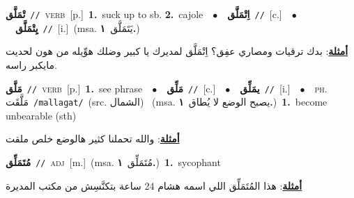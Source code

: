 \documentclass[10pt,a4paper,twoside]{article} %
\begin{document}
\begin{multicols}{2}
{\setlength\topsep{0pt}\textbf{\foreignlanguage{arabic}{تْمَلَّق}}\ {\color{gray}\texttt{//}\color{black}}\ \textsc{verb}\ [p.]\ \textbf{1.}~suck up to sb.  \textbf{2.}~cajole\ \ $\bullet$\ \ \setlength\topsep{0pt}\textbf{\foreignlanguage{arabic}{اِتْمَلَّق}}\ {\color{gray}\texttt{//}\color{black}}\ [c.]\ \ $\bullet$\ \ \setlength\topsep{0pt}\textbf{\foreignlanguage{arabic}{يِتْمَلَّق}}\ {\color{gray}\texttt{//}\color{black}}\ [i.]\ \color{gray}(msa. \foreignlanguage{arabic}{يَتَمَلَّق}~\foreignlanguage{arabic}{\textbf{١.}})\color{black}\  \begin{flushright}\color{gray}\foreignlanguage{arabic}{\textbf{\underline{\foreignlanguage{arabic}{أمثلة}}}: بدك ترقيات ومصاري عفِق؟ اِتْمَلَّق لمديرك يا كبير وضلك هوِّيله من هون لحديت مايكبر راسه.}\end{flushright}\color{black}} \vspace{2mm}

{\setlength\topsep{0pt}\textbf{\foreignlanguage{arabic}{مَلَّق}}\ {\color{gray}\texttt{//}\color{black}}\ \textsc{verb}\ [p.]\ \textbf{1.}~see phrase\ \ $\bullet$\ \ \setlength\topsep{0pt}\textbf{\foreignlanguage{arabic}{مَلِّق}}\ {\color{gray}\texttt{//}\color{black}}\ [c.]\ \ $\bullet$\ \ \setlength\topsep{0pt}\textbf{\foreignlanguage{arabic}{يمَلِّق}}\ {\color{gray}\texttt{//}\color{black}}\ [i.]\ \ $\bullet$\ \ \textsc{ph.} \color{gray} \foreignlanguage{arabic}{مَلَّقَت}\color{black}\ {\color{gray}\texttt{/{\sffamily mallaɡat}/}\color{black}}\ \color{gray}(src. \foreignlanguage{arabic}{الشمال})\color{black}\ \color{gray} (msa. \foreignlanguage{arabic}{يصبح الوضع لا يُطاق}~\foreignlanguage{arabic}{\textbf{١.}})\color{black}\ \textbf{1.}~become unbearable (sth)\  \begin{flushright}\color{gray}\foreignlanguage{arabic}{\textbf{\underline{\foreignlanguage{arabic}{أمثلة}}}: والله تحملنا كثير هالوضع خلص ملقت}\end{flushright}\color{black}} \vspace{2mm}

{\setlength\topsep{0pt}\textbf{\foreignlanguage{arabic}{مُتَمَلِّق}}\ {\color{gray}\texttt{//}\color{black}}\ \textsc{adj}\ [m.]\ \color{gray}(msa. \foreignlanguage{arabic}{مُتَمَلِّق}~\foreignlanguage{arabic}{\textbf{١.}})\color{black}\ \textbf{1.}~sycophant\  \begin{flushright}\color{gray}\foreignlanguage{arabic}{\textbf{\underline{\foreignlanguage{arabic}{أمثلة}}}: هذا المُتَمَلِّق اللي اسمه هشام 24 ساعة بتكنَّسِش من مكتب المديرة}\end{flushright}\color{black}} \vspace{2mm}


\end{multicols}
\end{document}
